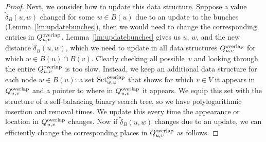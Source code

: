 \documentclass[11pt]{article}
\theoremstyle{definition}
\theoremstyle{remark}
\begin{document}
\begin{titlepage}
\begin{proof}
    Next, we consider how to update this data structure. Suppose a value $\tilde\delta_B(u,w)$ changed for some $w\in B(u)$ due to an update to the bunches (Lemma~\ref{lm:updatebunches}), then we would need to change the corresponding entries in $Q^{\rm{overlap}}_{u,v}$. Lemma~\ref{lm:updatebunches} gives us $u$, $w$, and the new distance $\tilde \delta_B(u,w)$, which we need to update in all data structures $Q^{\rm{overlap}}_{u,v}$ for which $w\in B(u) \cap B(v)$. Clearly checking all possible~$v$ and looking through the entire $Q^{\rm{overlap}}_{u,v}$ is too slow. Instead, we keep an additional data structure for each node $w\in B(u)$: a set $\text{Set}_{w,u}^{\rm{overlap}}$ that shows for which $v\in V$ it appears in $Q^{\rm{overlap}}_{u,v}$ and a pointer to where in $Q^{\rm{overlap}}_{u,v}$ it appears. We equip this set with the structure of a self-balancing binary search tree, so we have polylogarithmic insertion and removal times. We update this every time the appearance or location in $Q^{\rm{overlap}}_{u,v}$ changes. Now if $\tilde\delta_B(u,w)$ changes due to an update, we can efficiently change the corresponding places in $Q^{\rm{overlap}}_{u,v}$ as follows. 
    

\end{proof}
\end{titlepage}
\end{document}
